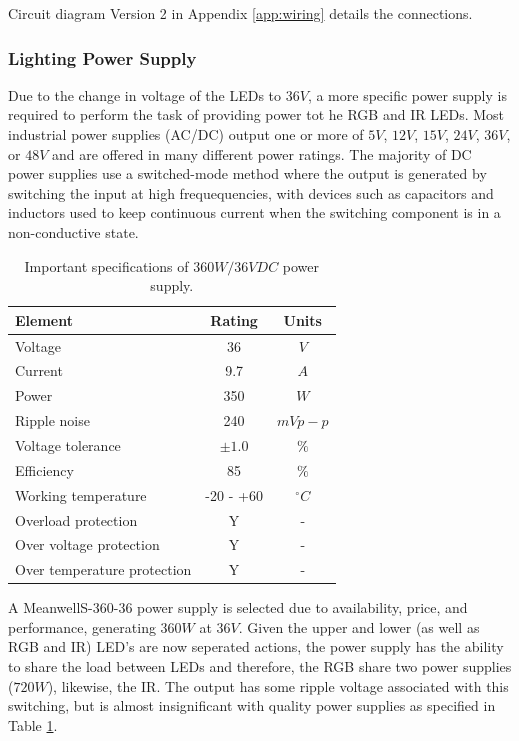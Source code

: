\documentclass[fleqn,twoside]{article}
\begin{document}
Circuit diagram Version 2 in Appendix \ref{app:wiring} details the connections.


\subsubsection{Lighting Power Supply}

Due to the change in voltage of the LEDs to $36V$, a more specific power supply is required to perform the task of providing power tot he RGB and IR LEDs. Most industrial power supplies (AC/DC) output one or more of $5V$, $12V$, $15V$, $24V$, $36V$, or $48V$ and are offered in many different power ratings. The majority of DC power supplies use a switched-mode method where the output is generated by switching the input at high frequequencies, with devices such as capacitors and inductors used to keep continuous current when the switching component is in a non-conductive state. 

\begin{table}[h]
	\centering
	\caption{Important specifications of $360W/36VDC$ power supply.}
	\label{tab:meanwell_specs}
	\begin{tabularx}{0.7\linewidth}{Xcc}
		\toprule
		\textbf{Element}  & \textbf{Rating} & \textbf{Units} \\[8pt]
		\midrule
		Voltage 					& 36 & $V$ \\[4pt]
		Current 					& 9.7 & $A$ \\[4pt]
		Power 						& 350 & $W$  \\[4pt]
		Ripple noise 				& 240 & $mVp-p$  \\[4pt]
		Voltage tolerance 			& $\pm1.0$ & $\%$  \\[4pt]
		Efficiency 					& 85 & $\%$ \\[4pt]
		Working temperature 		& -20 - +60 & $^{\circ}C$ \\[4pt]
		Overload protection 		& Y & - \\[4pt]
		Over voltage protection 	& Y & - \\[4pt]
		Over temperature protection & Y & - \\[4pt]
		\bottomrule
	\end{tabularx}
\end{table}

A Meanwell\texttrademark S-360-36 power supply is selected due to availability, price, and performance, generating $360W$ at $36V$. Given the upper and lower (as well as RGB and IR) LED's are now seperated actions, the power supply has the ability to share the load between LEDs and therefore, the RGB share two power supplies ($720W$), likewise, the IR. The output has some ripple voltage associated with this switching, but is almost insignificant with quality power supplies as specified in Table \ref{tab:meanwell_specs}.
\end{document}
